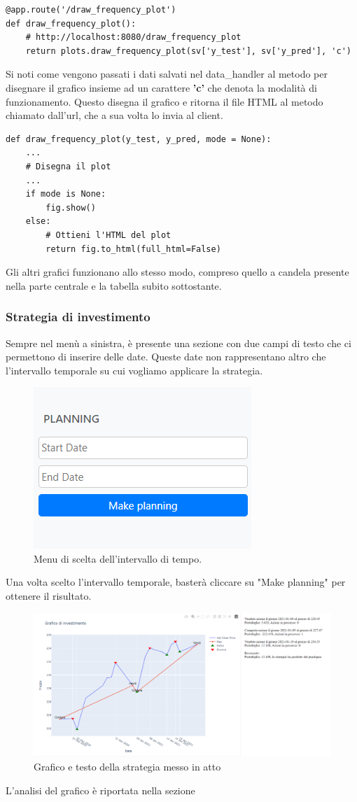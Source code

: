 \documentclass{article}
\begin{document}
\begin{verbatim}
@app.route('/draw_frequency_plot')
def draw_frequency_plot():
    # http://localhost:8080/draw_frequency_plot
    return plots.draw_frequency_plot(sv['y_test'], sv['y_pred'], 'c')
\end{verbatim}
Si noti come vengono passati i dati salvati nel data\_handler al metodo per disegnare il grafico insieme ad un carattere \textbf{'c'} che denota la modalità di funzionamento. Questo disegna il grafico e ritorna il file HTML al metodo chiamato dall'url, che a sua volta lo invia al client.
\begin{verbatim}
def draw_frequency_plot(y_test, y_pred, mode = None):
    ...
    # Disegna il plot
    ...
    if mode is None:
        fig.show()
    else:
        # Ottieni l'HTML del plot
        return fig.to_html(full_html=False)
\end{verbatim}
Gli altri grafici funzionano allo stesso modo, compreso quello a candela presente nella parte centrale e la tabella subito sottostante.
\subsubsection{Strategia di investimento}
Sempre nel menù a sinistra, è presente una sezione con due campi di testo che ci permettono di inserire delle date. Queste date non rappresentano altro che l'intervallo temporale su cui vogliamo applicare la strategia.
\begin{figure}[H]
\centering
\includegraphics[width=0.30\linewidth]{planning.png}
\caption{\label{fig:planning_menu}Menu di scelta dell'intervallo di tempo.}
\end{figure}
Una volta scelto l'intervallo temporale, basterà cliccare su "Make planning" per ottenere il risultato.
\begin{figure}[H]
\centering
\includegraphics[width=0.85\linewidth]{query_result.png}
\caption{\label{fig:planning_view}Grafico e testo della strategia messo in atto}
\end{figure}
L'analisi del grafico è riportata nella sezione 
\end{document}
